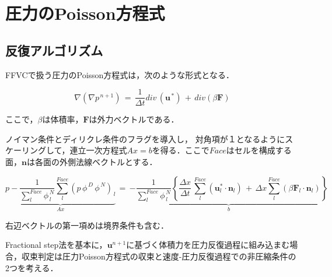 \graphicspath{{./fig_EBCS/}}
%
\section{圧力のPoisson方程式}

\subsection{反復アルゴリズム}

FFVCで扱う圧力のPoisson方程式は，次のような形式となる．

\begin{equation}
\nabla \left( \nabla p^{\,n+1} \right) \,=\, \frac{1}{\Delta t} div\, ( \bm{u}^{\,*}) \,+\, div( \beta \bm{F} )
\label{eq:Poisson_ffvc}
\end{equation}


\noindent ここで，$\beta$は体積率，$\bm{F}$は外力ベクトルである．

ノイマン条件とディリクレ条件のフラグを導入し，
対角項が１となるようにスケーリングして，連立一次方程式$Ax = b$を得る．ここで$Face$はセルを構成する面，$\bm{n}$は各面の外側法線ベクトルとする．

\begin{equation}
\underbrace{ p  -  \frac{1}{\sum \limits_{l}^{Face} \phi^{\,N}_{\,l}} \sum \limits_l^{Face} {\left( p \,\phi^{\,D} \,\phi^{\,N} \right)}_{\,l} } \limits_{A x }
\,=\,
 \displaystyle { 
\underbrace{ -
\frac{1}{\sum \limits_l^{Face} \phi^{\,N}_{\,l}} 
\left\{ 
\frac{\Delta x}{\Delta t} \,\sum \limits_l^{Face} \left( \bm{u}^*_l \cdot \bm{n}_l \right)
\,+\, 
\Delta x \sum \limits_l^{Face} \left( \beta \bm{F}_l \cdot \bm{n}_l \right)
\right\}
} \limits_{ b }
}
\label{eq:ebcs_poisson-discrete}
\end{equation}

\noindent 右辺ベクトルの第一項めは境界条件も含む．


Fractional step法を基本に，$\bm{u}^{n+1}$に基づく体積力を圧力反復過程に組み込まむ場合，収束判定は圧力Poisson方程式の収束と速度-圧力反復過程での非圧縮条件の2つを考える．

